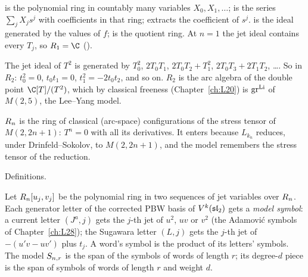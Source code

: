 \begin{dictionary}
 is the polynomial ring in countably many variables $X_0,X_1,\dots$; 
is the series $\sum_jX_js^j$ with coefficients in that ring;  extracts the coefficient of
$s^j$.  is the ideal generated by the values of $f$;  is the quotient ring.
At $n=1$ the jet ideal contains every $T_j$, so $R_1=\C$ ().
\end{dictionary}

\begin{example}[$n=2$]
The jet ideal of $T^2$ is generated by $T_0^2$, $2T_0T_1$, $2T_0T_2+T_1^2$, $2T_0T_3+2T_1T_2$, \dots. So in $R_2$:
$t_0^2=0$, $t_0t_1=0$, $t_1^2=-2t_0t_2$, and so on. $R_2$ is the arc algebra of the double point $\C[T]/(T^2)$, which by
classical freeness (Chapter~\ref{ch:L20}) is $\operatorname{gr}^{\mathrm{Li}}$ of $M(2,5)$, the Lee--Yang model.
\end{example}

\begin{physics}
$R_n$ is the ring of classical (arc-space) configurations of the stress tensor of $M(2,2n+1)$: $T^n=0$ with
all its derivatives. It enters because $L_{k_n}$ reduces, under Drinfeld--Sokolov, to $M(2,2n+1)$, and the model
remembers the stress tensor of the reduction.
\end{physics}

\begin{status}
Definitions.
\end{status}

\begin{definition}\label{l29:def:model}
Let $R_n[u_j,v_j]$ be the polynomial ring in two sequences of jet variables over $R_n$. Each
generator letter of the corrected PBW basis of $V^k(\mathfrak{sl}_2)$ gets a \emph{model symbol}: a current letter
$(J^a,j)$ gets the $j$-th jet of $u^2$, $uv$ or $v^2$ (the Adamovi\'c symbols of Chapter~\ref{ch:L28}); the Sugawara
letter $(L,j)$ gets the $j$-th jet of $-(u'v-uv')$ plus $t_j$. A word's symbol is the product of its letters' symbols.
The model $S_{n,r}$ is the span of the symbols of words of length $r$; its degree-$d$ piece is the span of symbols
of words of length $r$ and weight $d$.
\end{definition}

